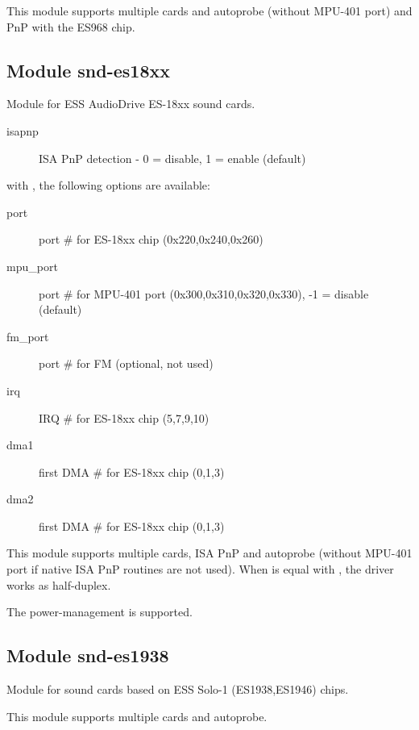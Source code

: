 \documentclass[a4paper,8pt,english]{sphinxmanual}
\begin{document}
This module supports multiple cards and autoprobe (without MPU-401 port)
and PnP with the ES968 chip.


\subsection{Module snd-es18xx}
\label{sound/alsa-configuration:module-snd-es18xx}
Module for ESS AudioDrive ES-18xx sound cards.
\begin{description}
\item[{isapnp}] \leavevmode
ISA PnP detection - 0 = disable, 1 = enable (default)

\end{description}

with , the following options are available:
\begin{description}
\item[{port}] \leavevmode
port \# for ES-18xx chip (0x220,0x240,0x260)

\item[{mpu\_port}] \leavevmode
port \# for MPU-401 port (0x300,0x310,0x320,0x330), -1 = disable (default)

\item[{fm\_port}] \leavevmode
port \# for FM (optional, not used)

\item[{irq}] \leavevmode
IRQ \# for ES-18xx chip (5,7,9,10)

\item[{dma1}] \leavevmode
first DMA \# for ES-18xx chip (0,1,3)

\item[{dma2}] \leavevmode
first DMA \# for ES-18xx chip (0,1,3)

\end{description}

This module supports multiple cards, ISA PnP and autoprobe (without MPU-401
port if native ISA PnP routines are not used).
When  is equal with , the driver works as half-duplex.

The power-management is supported.


\subsection{Module snd-es1938}
\label{sound/alsa-configuration:module-snd-es1938}
Module for sound cards based on ESS Solo-1 (ES1938,ES1946) chips.

This module supports multiple cards and autoprobe.
\end{document}
